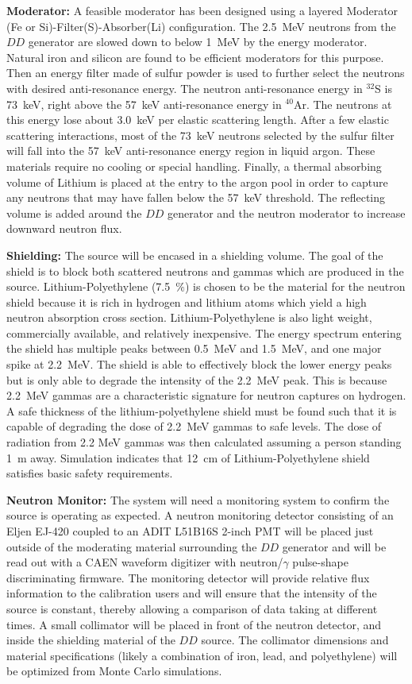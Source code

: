 {\bf Moderator:}  A feasible moderator has been designed using a layered Moderator (Fe or Si)-Filter(S)-Absorber(Li) %
configuration. The 2.5~MeV neutrons from the $DD$ generator are slowed down to below 1~MeV by the energy moderator. Natural iron and silicon are found to be efficient moderators for this purpose. Then an energy filter made of sulfur powder is used to further select the neutrons with desired anti-resonance energy.
The neutron anti-resonance energy in $^{32}$S is 73~keV, right above the 57~keV anti-resonance energy in $^{40}$Ar. The neutrons at this energy lose about 3.0~keV per elastic scattering length. After a few elastic scattering interactions, most of the 73~keV neutrons selected by the sulfur filter will fall into the 57~keV anti-resonance energy region in liquid argon. These materials require no cooling or special handling. Finally, a thermal absorbing volume of Lithium is placed at the entry to the argon pool in order to capture any neutrons that may have fallen below the 57~keV threshold. The reflecting volume is added around the $DD$ generator and the neutron moderator to increase downward neutron flux. 

{\bf Shielding:} The source will be encased in a shielding volume. The goal of the shield is to block both scattered neutrons and gammas which are produced in the source. Lithium-Polyethylene (7.5~$\%$) is chosen to be the material for the neutron shield because it is rich in hydrogen and lithium atoms which yield a high neutron absorption cross section. Lithium-Polyethylene is also light weight, commercially available, and relatively inexpensive. The energy spectrum entering the shield has multiple peaks between 0.5~MeV and 1.5~MeV, and one major spike at 2.2~MeV. The shield is able to effectively block the lower energy peaks but is only able to degrade the intensity of the 2.2~MeV peak. This is because 2.2~MeV gammas are a characteristic signature for neutron captures on hydrogen. A safe thickness of the lithium-polyethylene shield must be found such that it is capable of degrading the dose of 2.2~MeV gammas to safe levels. The dose of radiation from 2.2 MeV gammas was then calculated assuming a person standing 1~m away. Simulation indicates that 12~cm of Lithium-Polyethylene shield satisfies basic safety requirements. 

{\bf Neutron Monitor:} The system will need a monitoring system to confirm the source is operating as expected.  A neutron monitoring detector consisting of an Eljen EJ-420 coupled to an ADIT L51B16S 2-inch PMT will be placed just outside of the moderating material surrounding the $DD$ generator and will be read out with a CAEN waveform digitizer with neutron/$\gamma$ pulse-shape discriminating firmware. The monitoring detector will provide relative flux information to the calibration users and will ensure that the intensity of the source is constant, thereby allowing a comparison of data taking at different times.  A small collimator will be placed in front of the neutron detector, and inside the shielding material of the $DD$ source. The collimator dimensions and material specifications (likely a combination of iron, lead, and polyethylene) will be optimized from Monte Carlo simulations.

